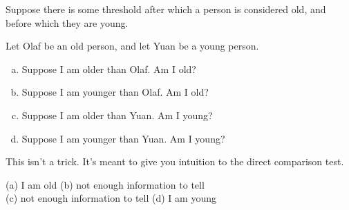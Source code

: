 \begin{question}\label{prob_s3.3:oldies}
Suppose there is some threshold after which a person is considered old, and before which they are young.

Let Olaf be an old person, and let Yuan be a young person.
\begin{enumerate}[(a)]
\item Suppose  I am older than Olaf. Am I old?
\item Suppose  I am younger than Olaf. Am I old?
\item Suppose  I am older than Yuan. Am I young?
\item Suppose  I am younger than Yuan. Am I young?
\end{enumerate}
\end{question}
\begin{hint}
This isn't a trick. It's meant to give you intuition to the direct comparison test.
\end{hint}
\begin{answer}
(a) I am old \qquad (b) not enough information to tell\\
(c) not enough information to tell \qquad (d) I am young
\end{answer}
